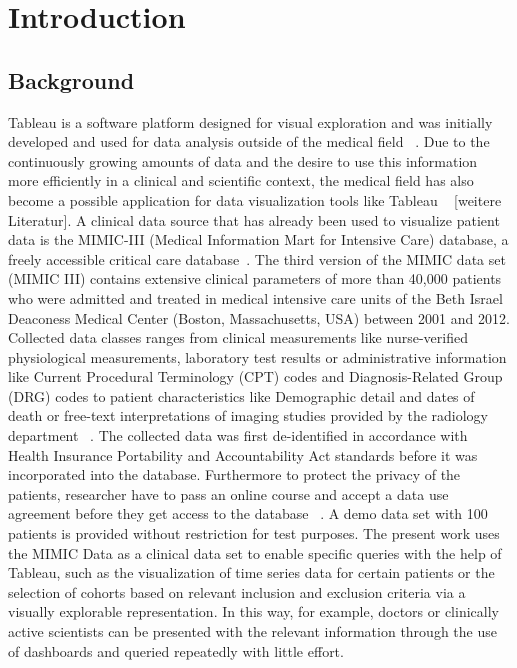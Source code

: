 \documentclass[aac]{iosart2x}
\begin{document}
\begin{frontmatter}
\begin{keyword}
\end{keyword}

\end{frontmatter}


\section{Introduction}\label{s1}

\subsection{Background}\label{s1.1}
%
Tableau is a software platform designed for visual exploration and was initially developed and used for data analysis outside of the medical field ~\cite{Tableau.2021}. Due to the continuously growing amounts of data and the desire to use this information more efficiently in a clinical and scientific context, the medical field has also become a possible application for data visualization tools like Tableau ~\cite{Ko.2017} [weitere Literatur]. 
A clinical data source that has already been used to visualize patient data is the MIMIC-III (Medical Information Mart for Intensive Care) database, a freely accessible critical care database~\cite{Festag.2019,Lee.2016,Johnson.2020,Johnson.2016}. The third version of the MIMIC data set (MIMIC III) contains extensive clinical parameters of more than 40,000 patients who were admitted and treated in medical intensive care units of the Beth Israel Deaconess Medical Center (Boston, Massachusetts, USA) between 2001 and 2012. Collected data classes ranges from clinical measurements like nurse-verified physiological measurements, laboratory test results or administrative information like Current Procedural Terminology (CPT) codes and Diagnosis-Related Group (DRG) codes to patient characteristics like Demographic detail and dates of death or free-text interpretations of imaging studies provided by the radiology department ~\cite{Johnson.2020,Johnson.2016}. The collected data was first de-identified in accordance with Health Insurance Portability and Accountability Act standards before it was incorporated into the database. Furthermore to protect the privacy of the patients, researcher have to pass an online course and accept a data use agreement before they get access to the database ~\cite{Johnson.2020,Johnson.2016}. A demo data set with 100 patients is provided without restriction for test purposes. 
The present work uses the MIMIC Data as a clinical data set to enable specific queries with the help of Tableau, such as the visualization of time series data for certain patients or the selection of cohorts based on relevant inclusion and exclusion criteria via a visually explorable representation. In this way, for example, doctors or clinically active scientists can be presented with the relevant information through the use of dashboards and queried repeatedly with little effort.
\end{document}

